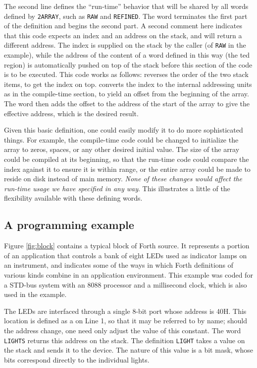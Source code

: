 The second line defines the ``run-time'' behavior that will be shared
by all words defined by \texttt{2ARRAY}, such as \texttt{RAW} and
\texttt{REFINED}. The word  terminates the first part of
the definition and begins the second part. A second comment here
indicates that this code expects an index and an address on the stack,
and will return a different address. The index is supplied on the stack
by the caller (of \texttt{RAW} in the example), while the address of
the content of a word defined in this way (the ted region)
is automatically pushed on top of the stack before this section of the
code is to be executed. This code works as follows:  reverses
the order of the two stack items, to get the index on top. 
 converts the index to the internal addressing units as in
the compile-time section, to yield an offset from the beginning of the
array. The word \word{+} then adds the offset to the address of the
start of the array to give the effective address, which is the desired
result.

Given this basic definition, one could easily modify it to do more
sophisticated things. For example, the compile-time code could be
changed to initialize the array to zeros, spaces, or any other
desired initial value. The size of the array could be compiled at
its beginning, so that the run-time code could compare the index
against it to ensure it is within range, or the entire array could
be made to reside on disk instead of main memory. \emph{None of these
changes would affect the run-time usage we have specified in any way}.
This illustrates a little of the flexibility available with these
defining words.

\subsection{A programming example} %

Figure \ref{fig:block} contains a typical block of Forth source. It
represents a portion of an application that controls a bank of eight
LEDs used as indicator lamps on an instrument, and indicates some of
the ways in which Forth definitions of various kinds combine in an
application environment. This example was coded for a STD-bus system
with an 8088 processor and a millisecond clock, which is also used in
the example.

The LEDs are interfaced through a single 8-bit port whose address is
40H. This location is defined as a  on Line 1, so that
it may be referred to by name; should the address change, one need
only adjust the value of this constant. The word \texttt{LIGHTS}
returns this address on the stack. The definition \texttt{LIGHT} takes
a value on the stack and sends it to the device. The nature of this
value is a bit mask, whose bits correspond directly to the individual
lights.


